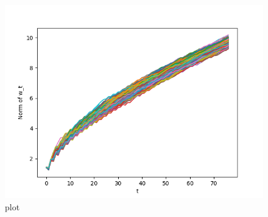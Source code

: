 \documentclass[12pt,a4paper]{article}
\begin{document}
\begin{figure}[hbp]
\begin{minipage}{0.48\linewidth}
    \end{minipage}\hfil
    \begin{minipage}{0.48\linewidth}
        \centering
        \includegraphics[width = \linewidth]{Hw1P11.png}
        \caption{plot}
    \end{minipage}\hfil
\end{figure}

\newpage
\end{document}
